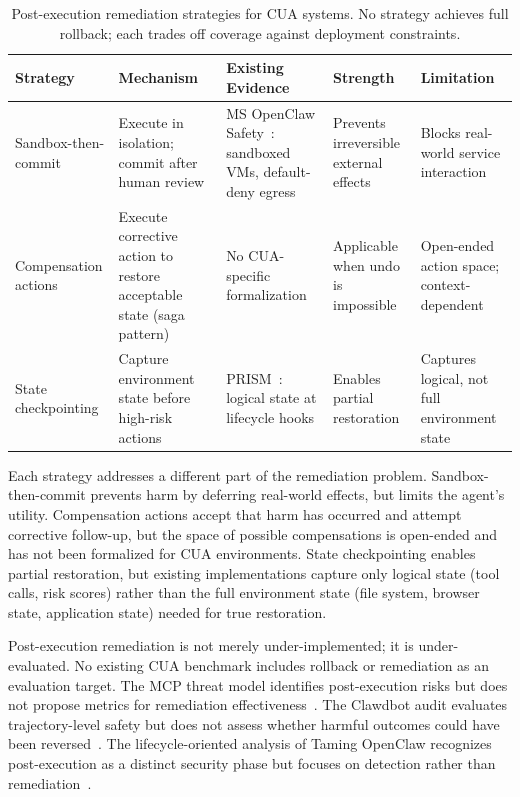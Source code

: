 \begin{table}[!ht]
\centering
\caption{Post-execution remediation strategies for CUA systems. No strategy achieves full rollback; each trades off coverage against deployment constraints.}
\label{tab:remediation-strategies}
\footnotesize
\setlength{\tabcolsep}{4pt}
\begin{tabular}{p{2.2cm} p{3.0cm} p{2.8cm} p{2.5cm} p{2.5cm}}
\toprule
\textbf{Strategy} & \textbf{Mechanism} & \textbf{Existing Evidence} & \textbf{Strength} & \textbf{Limitation} \\
\midrule
Sandbox-then-commit & Execute in isolation; commit after human review & MS OpenClaw Safety~\cite{msOpenClawSafety2026}: sandboxed VMs, default-deny egress & Prevents irreversible external effects & Blocks real-world service interaction \\
\midrule
Compensation actions & Execute corrective action to restore acceptable state (saga pattern) & No CUA-specific formalization & Applicable when undo is impossible & Open-ended action space; context-dependent \\
\midrule
State checkpointing & Capture environment state before high-risk actions & PRISM~\cite{openclawprism2026}: logical state at lifecycle hooks & Enables partial restoration & Captures logical, not full environment state \\
\bottomrule
\end{tabular}
\end{table}

Each strategy addresses a different part of the remediation problem. Sandbox-then-commit prevents harm by deferring real-world effects, but limits the agent's utility. Compensation actions accept that harm has occurred and attempt corrective follow-up, but the space of possible compensations is open-ended and has not been formalized for CUA environments. State checkpointing enables partial restoration, but existing implementations capture only logical state (tool calls, risk scores) rather than the full environment state (file system, browser state, application state) needed for true restoration.

Post-execution remediation is not merely under-implemented; it is under-evaluated. No existing CUA benchmark includes rollback or remediation as an evaluation target. The MCP threat model identifies post-execution risks but does not propose metrics for remediation effectiveness~\cite{hou2025mcp}. The Clawdbot audit evaluates trajectory-level safety but does not assess whether harmful outcomes could have been reversed~\cite{clawaudit2026}. The lifecycle-oriented analysis of Taming OpenClaw recognizes post-execution as a distinct security phase but focuses on detection rather than remediation~\cite{tamingopenclaw2026}.

